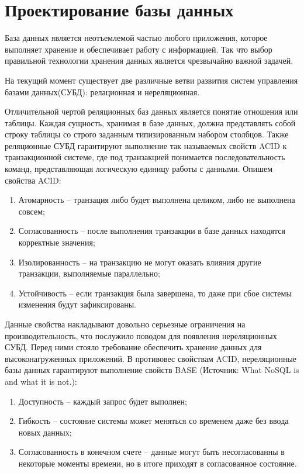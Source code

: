 \section*{Проектирование базы данных}

База данных является неотъемлемой частью любого приложения, которое выполняет
хранение и обеспечивает работу с информацией. Так что выбор правильной технологии
хранения данных является чрезвычайно важной задачей. 

На текущий момент существует две различные ветви развития систем управления
базами данных(СУБД): релационная и нереляционная.

Отличительной чертой реляционных баз данных является понятие отношения или таблицы.
Каждая сущность, хранимая в базе данных, должна представлять собой строку таблицы со 
строго заданным типизированным набором столбцов. Также реляционные СУБД гарантируют
выполнение так называемых свойств ACID к транзакционной системе, где под транзакцией
понимается последовательность команд, представляющая логическую единицу работы с данными.
Опишем свойства ACID: 

\begin{enumerate}
    \item Атомарность -- транзация либо будет выполнена целиком, либо
        не выполнена совсем;
    \item Согласованность -- после выполнения транзакции в базе данных
        находятся корректные значения;
    \item Изолированность -- на транзакцию не могут оказать влияния другие транзакции,
        выполняемые параллельно;
    \item Устойчивость -- если транзакция была завершена, то даже при сбое системы
        изменения будут зафиксированы.
\end{enumerate}

Данные свойства накладывают довольно серьезные ограничения на производительность, что
послужило поводом для появления нереляционных СУБД. Перед ними стояло требование
обеспечить хранение данных для высоконагруженных приложений. В противовес
свойствам ACID, нереляционные базы данных гарантируют выполнение свойств BASE
(Источник: What NoSQL is and what it is not.):

\begin{enumerate}
    \item Доступность -- каждый запрос будет выполнен;
    \item Гибкость -- состояние системы может меняться со временем даже без ввода новых данных;
    \item Согласованность в конечном счете -- данные могут быть несогласованны в некоторые
        моменты времени, но в итоге приходят в согласованное состояние.
\end{enumerate}


